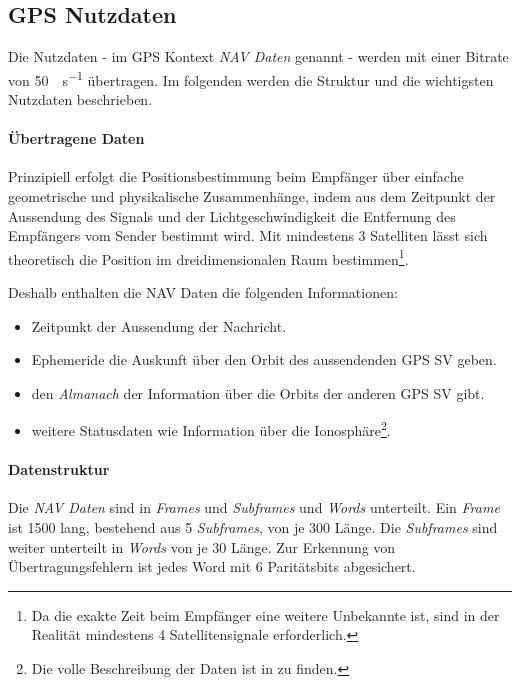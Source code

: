
\subsection{GPS Nutzdaten}
Die Nutzdaten - im GPS Kontext \emph{NAV Daten} genannt - werden mit einer Bitrate von \SI{50}{\bit\per\second} übertragen. Im folgenden werden die Struktur und die wichtigsten Nutzdaten beschrieben.

\paragraph{Übertragene Daten}
Prinzipiell erfolgt die Positionsbestimmung beim Empfänger über einfache geometrische und physikalische Zusammenhänge, indem aus dem Zeitpunkt der Aussendung des Signals und der Lichtgeschwindigkeit die Entfernung des Empfängers vom Sender bestimmt wird. Mit mindestens 3 Satelliten lässt sich theoretisch die Position im dreidimensionalen Raum bestimmen\footnote{Da die exakte Zeit beim Empfänger eine weitere Unbekannte ist, sind in der Realität mindestens 4 Satellitensignale erforderlich.}.

Deshalb enthalten die NAV Daten die folgenden Informationen:
\begin{itemize}
\item Zeitpunkt der Aussendung der Nachricht.
\item Ephemeride die Auskunft über den Orbit des aussendenden GPS \gls{SV} geben.
\item den \emph{Almanach} der Information über die Orbits der anderen GPS \gls{SV} gibt.
\item weitere Statusdaten wie Information über die Ionosphäre\footnote{Die volle Beschreibung der Daten ist in \cite{specification2010gps} zu finden.}.
\end{itemize}

\paragraph{Datenstruktur}
Die \emph{NAV Daten} sind in \emph{Frames} und \emph{Subframes} und \emph{Words} unterteilt. Ein \emph{Frame} ist \SI{1500}{\bit} lang, bestehend aus 5 \emph{Subframes}, von je \SI{300}{\bit} Länge. Die \emph{Subframes} sind weiter unterteilt in \emph{Words} von je \SI{30}{\bit} Länge. Zur Erkennung von Übertragungsfehlern ist jedes Word mit 6 Paritätsbits abgesichert. 

